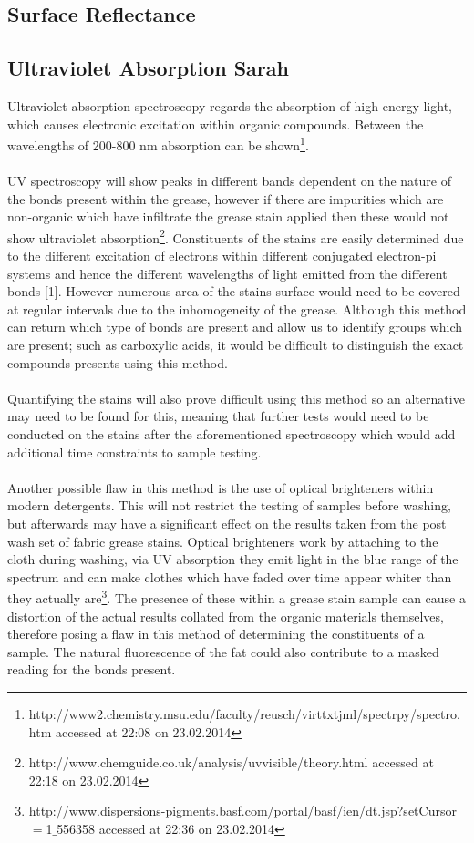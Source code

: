 \documentclass[a4paper ,12pt]{article}
\begin{document}
\subsection{Surface Reflectance}
\subsection{Ultraviolet Absorption Sarah}
Ultraviolet absorption spectroscopy regards the absorption of high-energy light, which causes electronic excitation within organic compounds. Between the wavelengths of 200-800 nm absorption can be shown\footnote{http://www2.chemistry.msu.edu/faculty/reusch/virttxtjml/spectrpy/spectro.htm accessed at 22:08 on 23.02.2014}.\\\\UV spectroscopy will show peaks in different bands dependent on the nature of the bonds present within the grease, however if there are impurities which are non-organic which have infiltrate the grease stain applied then these would not show ultraviolet absorption\footnote{http://www.chemguide.co.uk/analysis/uvvisible/theory.html accessed at 22:18 on 23.02.2014}. Constituents of the stains are easily determined due to the different excitation of electrons within different conjugated electron-pi systems and hence the different wavelengths of light emitted from the different bonds [1]. However numerous area of the stains surface would need to be covered at regular intervals due to the inhomogeneity of the grease. Although this method can return which type of bonds are present and allow us to identify groups which are present; such as carboxylic acids, it would be difficult to distinguish the exact compounds presents using this method.\\\\Quantifying the stains will also prove difficult using this method so an alternative may need to be found for this, meaning that further tests would need to be conducted on the stains after the aforementioned spectroscopy which would add additional time constraints to sample testing.\\\\Another possible flaw in this method is the use of optical brighteners within modern detergents. This will not restrict the testing of samples before washing, but afterwards may have a significant effect on the results taken from the post wash set of fabric grease stains. Optical brighteners work by attaching to the cloth during washing, via UV absorption they emit light in the blue range of the spectrum and can make clothes which have faded over time appear whiter than they actually are\footnote{http://www.dispersions-pigments.basf.com/portal/basf/ien/dt.jsp?setCursor$=$1$\_$556358 accessed at 22:36 on 23.02.2014}. The presence of these within a grease stain sample can cause a distortion of the actual results collated from the organic materials themselves, therefore posing a flaw in this method of determining the constituents of a sample. The natural fluorescence of the fat could also contribute to a masked reading for the bonds present. 
\end{document}
